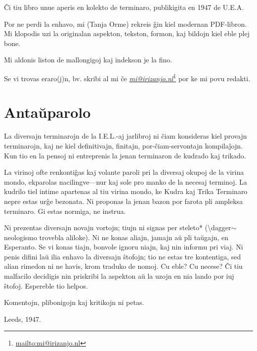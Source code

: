 \newpage

\newpage\vspace*{\fill}
\thispagestyle{empty}

Ĉi tiu libro unue aperis en kolekto de terminaro, publikigita en 1947 de U.E.A.

Por ne perdi la enhavo, mi (Tanja Orme) rekreis ĝin kiel modernan PDF-libron. Mi klopodis uzi la originalan aspekton, tekston, formon, kaj bildojn kiel eble plej bone.

Mi aldonis liston de mallongigoj kaj indekson je la fino.

Se vi trovas eraro(j)n, bv. skribi al mi ĉe \href{mailto:mi@irizanjo.nl}{\emph{mi@irizanjo.nl}}\footnote{\href{mailto:mi@irizanjo.nl}{mailto:mi@irizanjo.nl}} por ke mi povu redakti.

\newpage

\section[Antaŭparolo]{Antaŭparolo}
\hypertarget{Antaŭparolo}{}
\label{Antaŭparolo}


\thispagestyle{empty}

La diversajn terminarojn de la I.E.L.-aj jarlibroj ni ĉiam konsideras kiel provajn terminarojn, kaj ne kiel definitivajn, finitajn, por-ĉiam-servontajn kompilaĵojn. Kun tio en la pensoj ni entreprenis la jenan terminaron de kudrado kaj trikado.

La virinoj ofte renkontiĝas kaj volante paroli pri la diversaj okupoj de la virina mondo, ekparolas nacilingve---nur kaj sole pro manko de la necesaj terminoj. La kudrilo tiel intime apartenas al tiu virina mondo, ke Kudra kaj Trika Terminaro nepre estas urĝe bezonata. Ni proponas la jenan bazon por farota pli ampleksa terminaro. Gi estas normiga, ne instrua.

Ni prezentas diversajn novajn vortojn; tiujn ni signas per steleto* (\textbackslash{}dagger\ensuremath{\sim} neologismo trovebla aliloke). Ni ne konas aliajn, jamajn aŭ pli taŭgajn, en Esperanto. Se vi konas tiajn, bonvole ignoru niajn, kaj nin informu pri viaj. Ni penis difini laŭ ilia enhavo la diversajn ŝtofojn; tio ne estas tre kontentiga, sed alian rimedon ni ne havis, krom traduko de nomoj. Cu eble? Cu necese? Ĉi tiu malfacilo decidigis nin priskribi la aspekton aŭ la uzojn en nia lando por iuj ŝtofoj. Espereble tio helpos.

Komentojn, plibonigojn kaj kritikojn ni petas.

Leeds, 1947.

